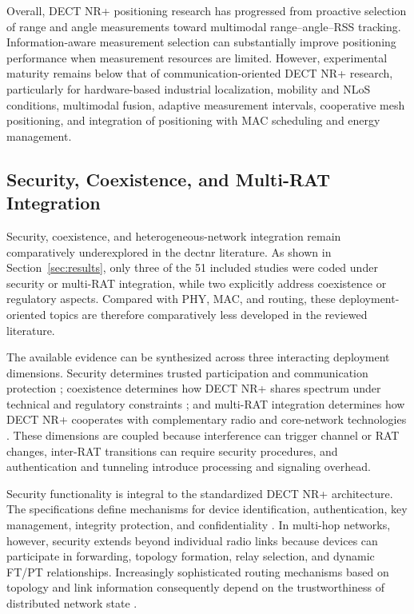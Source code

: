 Overall, DECT NR+ positioning research has progressed from proactive selection of range and angle measurements toward multimodal range--angle--RSS tracking. Information-aware measurement selection can substantially improve positioning performance when measurement resources are limited. However, experimental maturity remains below that of communication-oriented DECT NR+ research, particularly for hardware-based industrial localization, mobility and NLoS conditions, multimodal fusion, adaptive measurement intervals, cooperative mesh positioning, and integration of positioning with MAC scheduling and energy management.


\subsection{Security, Coexistence, and Multi-RAT Integration}
\label{subsec:security_coexistence}

Security, coexistence, and heterogeneous-network integration remain comparatively underexplored in the \gls{dectnr} literature. As shown in Section~\ref{sec:results}, only three of the 51 included studies were coded under security or multi-RAT integration, while two explicitly address coexistence or regulatory aspects. Compared with PHY, MAC, and routing, these deployment-oriented topics are therefore comparatively less developed in the reviewed literature.

The available evidence can be synthesized across three interacting deployment dimensions. Security determines trusted participation and communication protection \cite{etsi_ts103636_4,etsi_ts103636_5}; coexistence determines how DECT NR+ shares spectrum under technical and regulatory constraints \cite{samuylovPerformanceAssessmentDECT20202023, samuylovPerformanceDECT2020NR2025}; and multi-RAT integration determines how DECT NR+ cooperates with complementary radio and core-network technologies \cite{dangEWDCIntegratingDECT20202025a, dangUniRATUnifiedDECT20202026}. These dimensions are coupled because interference can trigger channel or RAT changes, inter-RAT transitions can require security procedures, and authentication and tunneling introduce processing and signaling overhead.

Security functionality is integral to the standardized DECT NR+ architecture. The specifications define mechanisms for device identification, authentication, key management, integrity protection, and confidentiality \cite{etsi_ts103636_4,etsi_ts103636_5}. In multi-hop networks, however, security extends beyond individual radio links because devices can participate in forwarding, topology formation, relay selection, and dynamic FT/PT relationships. Increasingly sophisticated routing mechanisms based on topology and link information consequently depend on the trustworthiness of distributed network state \cite{fuhrlingRobustRoutingProtocol2025b, rauwolfTopologyAwareDeepReinforcement2026a}.


